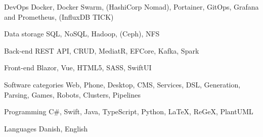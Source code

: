 \begin{cvskills}
\cvskill
{DevOps} %
{Docker, Docker Swarm, (HashiCorp Nomad), Portainer, GitOps, Grafana and Prometheus, (InfluxDB TICK)} %

\cvskill
{Data storage} %
{SQL, NoSQL, Hadoop, (Ceph), NFS} %

\cvskill
{Back-end} %
{REST API, CRUD, MediatR, EFCore, Kafka, Spark} %

\cvskill
{Front-end} %
{Blazor, Vue, HTML5, SASS, SwiftUI} %

\cvskill
{Software categories} %
{Web, Phone, Desktop, CMS, Services, DSL, Generation, Parsing, Games, Robots, Clusters, Pipelines} %

\cvskill
{Programming} %
{C\#, Swift, Java, TypeScript, Python, LaTeX, ReGeX, PlantUML} %

\cvskill
{Languages} %
{Danish, English} %
\end{cvskills}
